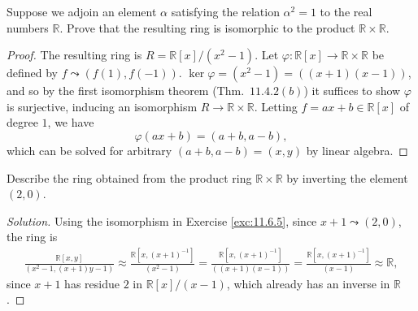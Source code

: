 \documentclass[12pt]{article}
\theoremstyle{remark}
\begin{document}
\begin{problem}\label{exc:11.6.5}
  Suppose we adjoin an element $\alpha$ satisfying the relation $\alpha^2=1$ to the real numbers $\mathbb{R}$. Prove that the resulting ring is isomorphic to the product $\mathbb{R} \times \mathbb{R}$.
\end{problem}
\begin{proof}
  The resulting ring is $R = \mathbb{R}[x]/(x^2-1)$. Let $\varphi\colon\mathbb{R}[x] \to \mathbb{R} \times \mathbb{R}$ be defined by $f \leadsto (f(1),f(-1))$. $\ker\varphi = (x^2-1) = ((x+1)(x-1))$, and so by the first isomorphism theorem (Thm.~$11.4.2(b)$) it suffices to show $\varphi$ is surjective, inducing an isomorphism $R \to \mathbb{R} \times \mathbb{R}$. Letting $f = ax+b \in \mathbb{R}[x]$ of degree $1$, we have
  \begin{equation*}
    \varphi(ax+b) = (a+b,a-b),
  \end{equation*}
  which can be solved for arbitrary $(a+b,a-b) = (x,y)$ by linear algebra.
\end{proof}

\begin{problem}
  Describe the ring obtained from the product ring $\mathbb{R} \times \mathbb{R}$ by inverting the element $(2,0)$.
\end{problem}
\begin{proof}[Solution]
  Using the isomorphism in Exercise \ref{exc:11.6.5}, since $x+1 \leadsto (2,0)$, the ring is
  \begin{align*}
    \frac{\mathbb{R}[x,y]}{(x^2-1,(x+1)y-1)} \approx \frac{\mathbb{R}[x,(x+1)^{-1}]}{(x^2-1)} = \frac{\mathbb{R}[x,(x+1)^{-1}]}{((x+1)(x-1))} = \frac{\mathbb{R}[x,(x+1)^{-1}]}{(x-1)} \approx \mathbb{R},
  \end{align*}
  since $x+1$ has residue $2$ in $\mathbb{R}[x]/(x-1)$, which already has an inverse in $\mathbb{R}$.
\end{proof}
\end{document}
